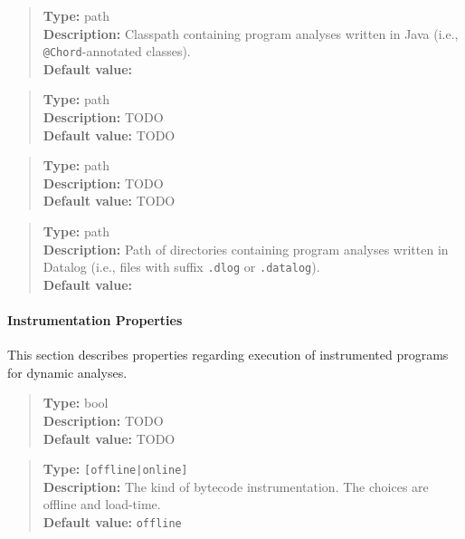 \noindent {}
\begin{quote}
{\bf Type:} path \\
{\bf Description:} Classpath containing program analyses written in Java (i.e., {\tt @Chord}-annotated classes).  \\
{\bf Default value:} 
\end{quote}

\noindent {}
\begin{quote}
{\bf Type:} path \\
{\bf Description:} TODO \\
{\bf Default value:} TODO
\end{quote}

\noindent {}
\begin{quote}
{\bf Type:} path \\
{\bf Description:} TODO \\
{\bf Default value:} TODO
\end{quote}

\noindent {}
\begin{quote}
{\bf Type:} path  \\
{\bf Description:} Path of directories containing program analyses written in Datalog (i.e., files with suffix {\tt .dlog} or {\tt .datalog}). \\
{\bf Default value:} 
\end{quote}

\paragraph{Instrumentation Properties}

This section describes properties regarding execution of instrumented programs for dynamic analyses.

\noindent {}
\begin{quote}
{\bf Type:} bool \\
{\bf Description:} TODO \\
{\bf Default value:} TODO
\end{quote}

\noindent {}
\begin{quote}
{\bf Type:} {\tt [offline|online]}  \\
{\bf Description:} The kind of bytecode instrumentation.  The choices are offline and load-time.  \\
{\bf Default value:} {\tt offline}
\end{quote}

